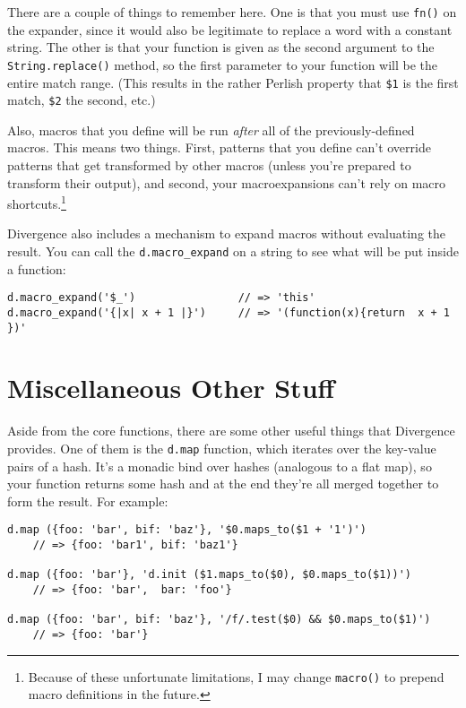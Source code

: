 \documentclass{report}
\begin{document}
    There are a couple of things to remember here. One is that you must use \verb|fn()| on the expander, since it would also be legitimate to replace a word with a constant string. The other
    is that your function is given as the second argument to the \verb|String.replace()| method, so the first parameter to your function will be the entire match range. (This results in the
    rather Perlish property that \verb|$1| is the first match, \verb|$2| the second, etc.)

    Also, macros that you define will be run {\em after} all of the previously-defined macros. This means two things. First, patterns that you define can't override patterns that get
    transformed by other macros (unless you're prepared to transform their output), and second, your macroexpansions can't rely on macro shortcuts.\footnote{Because of these unfortunate
    limitations, I may change {\tt macro()} to prepend macro definitions in the future.}

    Divergence also includes a mechanism to expand macros without evaluating the result. You can call the \verb|d.macro_expand| on a string to see what will be put inside a function:

\begin{verbatim}
d.macro_expand('$_')                // => 'this'
d.macro_expand('{|x| x + 1 |}')     // => '(function(x){return  x + 1 })'
\end{verbatim}

\chapter {Miscellaneous Other Stuff}
    \label{sec:miscellaneous-other-stuff}
    Aside from the core functions, there are some other useful things that Divergence provides. One of them is the \verb|d.map| function, which iterates over the key-value pairs of a hash.
    It's a monadic bind over hashes (analogous to a flat map), so your function returns some hash and at the end they're all merged together to form the result. For example:

\begin{verbatim}
d.map ({foo: 'bar', bif: 'baz'}, '$0.maps_to($1 + '1')')
    // => {foo: 'bar1', bif: 'baz1'}

d.map ({foo: 'bar'}, 'd.init ($1.maps_to($0), $0.maps_to($1))')
    // => {foo: 'bar',  bar: 'foo'}

d.map ({foo: 'bar', bif: 'baz'}, '/f/.test($0) && $0.maps_to($1)')
    // => {foo: 'bar'}
\end{verbatim}
\end{document}
